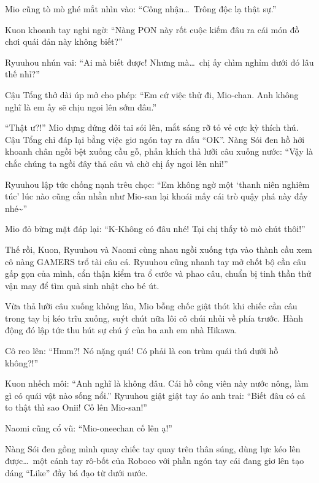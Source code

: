 \documentclass[../main.tex]{subfiles}
\begin{document}
Mio cũng tò mò ghé mắt nhìn vào: ``Công nhận\dots\ Trông độc lạ thật sự.''

Kuon khoanh tay nghi ngờ: ``Nàng PON này rốt cuộc kiếm đâu ra cái món đồ chơi quái đản này không biết?''

Ryuuhou nhún vai: ``Ai mà biết được! Nhưng mà\dots\ chị ấy chìm nghỉm dưới đó lâu thế nhỉ?''

Cậu Tổng thở dài úp mở cho phép: ``Em cứ việc thử đi, Mio-chan. Anh không nghĩ là em ấy sẽ chịu ngoi lên sớm đâu.''

``Thật ư?!'' Mio dựng đứng đôi tai sói lên, mắt sáng rỡ tỏ vẻ cực kỳ thích thú. Cậu Tổng chỉ đáp lại bằng việc giơ ngón tay ra dấu ``OK''. Nàng Sói đen hồ hởi khoanh chân ngồi bệt xuống cầu gỗ, phấn khích thả lưỡi câu xuống nước: ``Vậy là chắc chúng ta ngồi đây thả câu và chờ chị ấy ngoi lên nhỉ!''

Ryuuhou lập tức chống nạnh trêu chọc: ``Em không ngờ một `thanh niên nghiêm túc' lúc nào cũng cằn nhằn như Mio-san lại khoái mấy cái trò quậy phá này đấy nhé\~{}''

Mio đỏ bừng mặt đáp lại: ``K-Không có đâu nhé! Tại chị thấy tò mò chút thôi!''

Thế rồi, Kuon, Ryuuhou và Naomi cùng nhau ngồi xuống tựa vào thành cầu xem cô nàng GAMERS trổ tài câu cá. Ryuuhou cũng nhanh tay mở chốt bộ cần câu gấp gọn của mình, cẩn thận kiểm tra ổ cước và phao câu, chuẩn bị tinh thần thử vận may để tìm quà sinh nhật cho bé út.


\ct

Vừa thả lưỡi câu xuống không lâu, Mio bỗng chốc giật thót khi chiếc cần câu trong tay bị kéo trĩu xuống, suýt chút nữa lôi cô chúi nhủi về phía trước. Hành động đó lập tức thu hút sự chú ý của ba anh em nhà Hikawa.

Cô reo lên: ``Hmm?! Nó nặng quá! Có phải là con trùm quái thú dưới hồ không?!''

Kuon nhếch môi: ``Anh nghĩ là không đâu. Cái hồ công viên này nước nông, làm gì có quái vật nào sống nổi.'' Ryuuhou giật giật tay áo anh trai: ``Biết đâu có cá to thật thì sao Onii! Cố lên Mio-san!''

Naomi cũng cổ vũ: ``Mio-oneechan cố lên ạ!''

Nàng Sói đen gồng mình quay chiếc tay quay trên thân súng, dùng lực kéo lên được\dots\ một cánh tay rô-bốt của Roboco với phần ngón tay cái đang giơ lên tạo dáng ``Like'' đầy bá đạo từ dưới nước.

\end{document}
